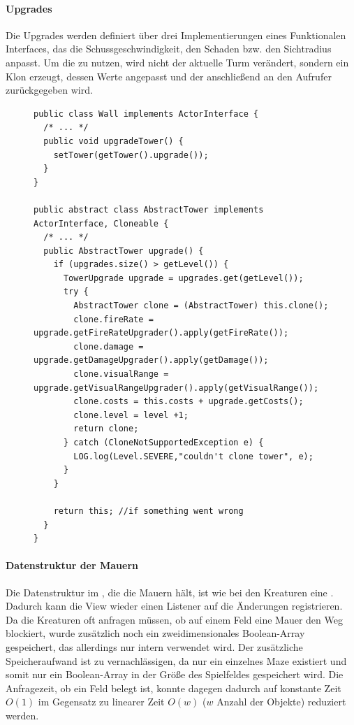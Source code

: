 \paragraph{Upgrades}
Die Upgrades werden definiert über drei Implementierungen eines Funktionalen Interfaces, das die Schussgeschwindigkeit, den Schaden bzw. den Sichtradius anpasst. Um die  zu nutzen, wird nicht der aktuelle Turm verändert, sondern ein Klon erzeugt, dessen Werte angepasst und der anschließend an den Aufrufer zurückgegeben wird. 
\begin{figure}[htb]
\begin{lstlisting}
public class Wall implements ActorInterface {
  /* ... */
  public void upgradeTower() {
    setTower(getTower().upgrade());
  }
}

public abstract class AbstractTower implements ActorInterface, Cloneable {
  /* ... */ 
  public AbstractTower upgrade() {
    if (upgrades.size() > getLevel()) {
      TowerUpgrade upgrade = upgrades.get(getLevel());
      try {
        AbstractTower clone = (AbstractTower) this.clone();
        clone.fireRate = upgrade.getFireRateUpgrader().apply(getFireRate());
        clone.damage = upgrade.getDamageUpgrader().apply(getDamage());
        clone.visualRange = upgrade.getVisualRangeUpgrader().apply(getVisualRange());
        clone.costs = this.costs + upgrade.getCosts();
        clone.level = level +1;
        return clone;
      } catch (CloneNotSupportedException e) {
        LOG.log(Level.SEVERE,"couldn't clone tower", e);
      }
    }
    
    return this; //if something went wrong
  }
}
\end{lstlisting}
\end{figure}

\paragraph{Datenstruktur der Mauern} Die Datenstruktur im , die die Mauern hält, ist wie bei den Kreaturen eine . Dadurch kann die View wieder einen Listener auf die Änderungen registrieren. Da die Kreaturen oft anfragen müssen, ob auf einem Feld eine Mauer den Weg blockiert, wurde zusätzlich noch ein zweidimensionales Boolean-Array gespeichert, das allerdings nur intern verwendet wird. Der zusätzliche Speicheraufwand ist zu vernachlässigen, da nur ein einzelnes Maze existiert und somit nur ein Boolean-Array in der Größe des Spielfeldes gespeichert wird. Die Anfragezeit, ob ein Feld belegt ist, konnte dagegen dadurch auf konstante Zeit \(O(1)\) im Gegensatz zu linearer Zeit \(O(w)\) (\(w\) Anzahl der  Objekte) reduziert werden. 


